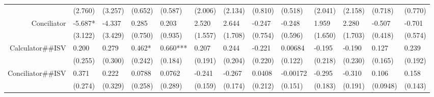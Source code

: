 \begin{tabular}{rrrrrrrrrrrrr}
      & \multicolumn{1}{l}{(2.760)} & \multicolumn{1}{l}{(3.257)} & \multicolumn{1}{l}{(0.652)} & \multicolumn{1}{l}{(0.587)} & \multicolumn{1}{l}{(2.006)} & \multicolumn{1}{l}{(2.134)} & \multicolumn{1}{l}{(0.810)} & \multicolumn{1}{l}{(0.518)} & \multicolumn{1}{l}{(2.041)} & \multicolumn{1}{l}{(2.158)} & \multicolumn{1}{l}{(0.718)} & \multicolumn{1}{l}{(0.770)} \\
Conciliator & \multicolumn{1}{l}{-5.687*} & \multicolumn{1}{l}{-4.337} & \multicolumn{1}{l}{0.285} & \multicolumn{1}{l}{0.203} & \multicolumn{1}{l}{2.520} & \multicolumn{1}{l}{2.644} & \multicolumn{1}{l}{-0.247} & \multicolumn{1}{l}{-0.248} & \multicolumn{1}{l}{1.959} & \multicolumn{1}{l}{2.280} & \multicolumn{1}{l}{-0.507} & \multicolumn{1}{l}{-0.701} \\
      & \multicolumn{1}{l}{(3.122)} & \multicolumn{1}{l}{(3.429)} & \multicolumn{1}{l}{(0.750)} & \multicolumn{1}{l}{(0.935)} & \multicolumn{1}{l}{(1.557)} & \multicolumn{1}{l}{(1.708)} & \multicolumn{1}{l}{(0.754)} & \multicolumn{1}{l}{(0.596)} & \multicolumn{1}{l}{(1.650)} & \multicolumn{1}{l}{(1.703)} & \multicolumn{1}{l}{(0.418)} & \multicolumn{1}{l}{(0.574)} \\
Calculator\#\#ISV & \multicolumn{1}{l}{0.200} & \multicolumn{1}{l}{0.279} & \multicolumn{1}{l}{0.462*} & \multicolumn{1}{l}{0.660***} & \multicolumn{1}{l}{0.207} & \multicolumn{1}{l}{0.244} & \multicolumn{1}{l}{-0.221} & \multicolumn{1}{l}{0.00684} & \multicolumn{1}{l}{-0.195} & \multicolumn{1}{l}{-0.190} & \multicolumn{1}{l}{0.127} & \multicolumn{1}{l}{0.239} \\
      & \multicolumn{1}{l}{(0.255)} & \multicolumn{1}{l}{(0.300)} & \multicolumn{1}{l}{(0.242)} & \multicolumn{1}{l}{(0.184)} & \multicolumn{1}{l}{(0.191)} & \multicolumn{1}{l}{(0.204)} & \multicolumn{1}{l}{(0.220)} & \multicolumn{1}{l}{(0.122)} & \multicolumn{1}{l}{(0.218)} & \multicolumn{1}{l}{(0.230)} & \multicolumn{1}{l}{(0.165)} & \multicolumn{1}{l}{(0.192)} \\
Conciliator\#\#ISV & \multicolumn{1}{l}{0.371} & \multicolumn{1}{l}{0.222} & \multicolumn{1}{l}{0.0788} & \multicolumn{1}{l}{0.0762} & \multicolumn{1}{l}{-0.241} & \multicolumn{1}{l}{-0.267} & \multicolumn{1}{l}{0.0408} & \multicolumn{1}{l}{-0.00172} & \multicolumn{1}{l}{-0.295} & \multicolumn{1}{l}{-0.310} & \multicolumn{1}{l}{0.106} & \multicolumn{1}{l}{0.158} \\
      & \multicolumn{1}{l}{(0.274)} & \multicolumn{1}{l}{(0.329)} & \multicolumn{1}{l}{(0.258)} & \multicolumn{1}{l}{(0.289)} & \multicolumn{1}{l}{(0.159)} & \multicolumn{1}{l}{(0.174)} & \multicolumn{1}{l}{(0.212)} & \multicolumn{1}{l}{(0.151)} & \multicolumn{1}{l}{(0.183)} & \multicolumn{1}{l}{(0.191)} & \multicolumn{1}{l}{(0.0948)} & \multicolumn{1}{l}{(0.143)} \\

\end{tabular}
